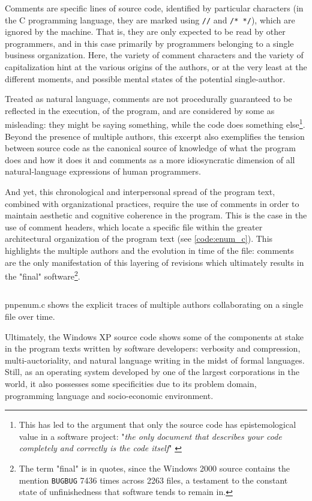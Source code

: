 Comments are specific lines of source code, identified by particular characters (in the C programming language, they are marked using \lstinline{//} and \lstinline{/* */}), which are ignored by the machine. That is, they are only expected to be read by other programmers, and in this case primarily by programmers belonging to a single business organization. Here, the variety of comment characters and the variety of capitalization hint at the various origins of the authors, or at the very least at the different moments, and possible mental states of the potential single-author.

Treated as natural language, comments are not procedurally guaranteed to be reflected in the execution, of the program, and are considered by some as misleading: they might be saying something, while the code does something else\footnote{This has led to the argument that only the source code has epistemological value in a software project: "\emph{the only document that describes your code completely and correctly is the code itself}" \citep{goodliffe_code_2007}}. Beyond the presence of multiple authors, this excerpt also exemplifies the tension between source code as the canonical source of knowledge of what the program does and how it does it and comments as a more idiosyncratic dimension of all natural-language expressions of human programmers.

And yet, this chronological and interpersonal spread of the program text, combined with organizational practices, require the use of comments in order to maintain aesthetic and cognitive coherence in the program. This is the case in the use of comment headers, which locate a specific file within the greater architectural organization of the program text (see \autoref{code:enum_c}). This highlights the multiple authors and the evolution in time of the file: comments are the only manifestation of this layering of revisions which ultimately results in the "final" software\footnote{The term "final" is in quotes, since the Windows 2000 source contains the mention \lstinline{BUGBUG} 7436 times across 2263 files, a testament to the constant state of unfinishedness that software tends to remain in.}.

\begin{listing}
  \inputminted{c}{./corpus/enum.c}
  \caption{pnpenum.c shows the explicit traces of multiple authors collaborating on a single file over time.}
  \label{code:enum_c}
\end{listing}

Ultimately, the Windows XP source code shows some of the components at stake in the program texts written by software developers: verbosity and compression, multi-auctoriality, and natural language writing in the midst of formal languages. Still, as an operating system developed by one of the largest corporations in the world, it also possesses some specificities due to its problem domain, programming language and socio-economic environment.


